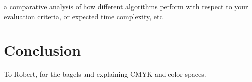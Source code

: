 \documentclass[acmlarge]{acmart}
\begin{document}
a comparative analysis of how different algorithms perform with respect to your evaluation
criteria, or expected time complexity, etc


\section{Conclusion}

\begin{acks}
To Robert, for the bagels and explaining CMYK and color spaces.
\end{acks}



\end{document}
